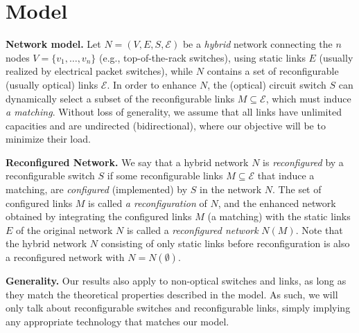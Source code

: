 \documentclass[sigconf]{acmart}
\newcommand{\E}{\mathcal{E}}  %
\newcommand\todo[1]{\color{red}\textbf{#1}\color{black}}
\begin{document}
\section{Model}\label{sec:model} %
\noindent\textbf{Network model.} Let  $N=(V,E,S,\E)$ be a \emph{hybrid} network \cite{solstice,eclipse} connecting the $n$ nodes $V=\{v_1,\dots,v_n\}$ (e.g., top-of-the-rack switches), using static links $E$ (usually realized by electrical packet switches), while $N$ contains a set of reconfigurable (usually optical) links $\E$.
In order to enhance $N$, the  (optical) circuit switch $S$ can dynamically select a subset of the reconfigurable links $M\subseteq \E$, which must induce \emph{a matching}.
Without loss of generality, we assume that all links have unlimited capacities and are undirected (bidirectional), where our objective will be to minimize their load.




\noindent\textbf{Reconfigured Network.}
We say that a hybrid network $N$ is \emph{reconfigured}
by a reconfigurable switch $S$ if some reconfigurable links $M\subseteq \E$ that induce a matching, are \emph{configured} (implemented) by $S$ in the network $N$. The set of configured links $M$ is called \emph{a reconfiguration} of $N$, and the enhanced network obtained by integrating the configured links $M$ (a matching) with the static links $E$ of the original network $N$ is called a \emph{reconfigured network} $N(M)$. Note that the hybrid network $N$ consisting of only static links before  reconfiguration is also a reconfigured network with $N=N(\emptyset)$. 

\noindent\textbf{Generality.}
Our results also apply to non-optical switches and links, as long as they match the theoretical properties described in the model.
As such, we will only talk about reconfigurable switches and reconfigurable links, simply implying any appropriate technology that matches our model.
\end{document}

